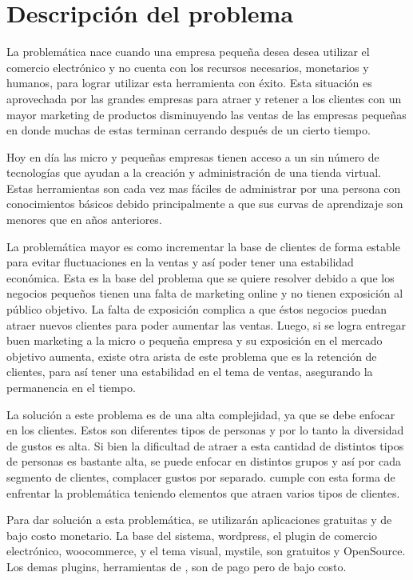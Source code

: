 \section{Descripción del problema}

La problemática nace cuando una empresa pequeña desea desea utilizar el comercio
electrónico y no cuenta con los recursos necesarios, monetarios y humanos,
para lograr utilizar esta herramienta con éxito.
Esta situación es aprovechada por las grandes empresas para atraer y retener a los
clientes con un mayor marketing de productos disminuyendo las ventas de las
empresas pequeñas en donde muchas de estas terminan cerrando después de un cierto
tiempo.

Hoy en día las micro y pequeñas empresas tienen acceso a un sin número de
tecnologías que ayudan a la creación y administración de una tienda virtual.
Estas herramientas son cada vez mas fáciles de administrar por una persona
con conocimientos básicos debido principalmente a que sus curvas de aprendizaje
son menores que en años anteriores.

La problemática mayor es como incrementar la base de clientes de forma estable
para evitar fluctuaciones en la ventas y así poder tener una estabilidad económica.
Esta es la base del problema que se quiere resolver debido a que los negocios
pequeños tienen una falta de marketing online y no tienen exposición al público
objetivo.
La falta de exposición complica a que éstos negocios puedan atraer nuevos clientes
para poder aumentar las ventas.
Luego, si se logra entregar buen marketing a la micro o pequeña empresa y su
exposición en el mercado objetivo aumenta, existe otra arista de este problema
que es la retención de clientes, para así tener una estabilidad en el tema
de ventas, asegurando la permanencia en el tiempo.

La solución a este problema es de una alta complejidad, ya que se debe enfocar en
los clientes.
Estos son diferentes tipos de personas y por lo tanto la diversidad de gustos es
alta.
Si bien la dificultad de atraer a esta cantidad de distintos tipos de personas
es bastante alta, se puede enfocar en distintos grupos y así por cada segmento
de clientes, complacer gustos por separado.
{\GAM} cumple con esta forma de enfrentar la problemática teniendo elementos que
atraen varios tipos de clientes.

Para dar solución a esta problemática, se utilizarán aplicaciones gratuitas y de
bajo costo monetario. La base del sistema, wordpress, el plugin de comercio
electrónico, woocommerce, y el tema visual, mystile, son gratuitos y OpenSource.
Los demas plugins, herramientas de {\GAM}, son de pago pero de bajo costo.

